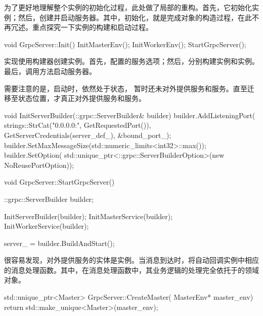 \begin{content}
为了更好地理解整个实例的初始化过程，此处做了局部的重构。首先，它初始化实例；然后，创建并启动服务器。其中，初始化，就是完成对象的构造过程，在此不再冗述。重点探究一下实例的构建和启动过程。

\begin{leftbar}
\begin{c++}
void GrpcServer::Init() {
  InitMasterEnv();
  InitWorkerEnv();
  StartGrpcServer();
}
\end{c++}
\end{leftbar}

实现使用构建器创建实例。首先，配置的服务选项；然后，分别构建实例和实例。最后，调用方法启动服务器。

需要注意的是，启动时，依然处于状态，
暂时还未对外提供服务和服务。直至迁移至状态位置，才真正对外提供服务和服务。

\begin{leftbar}
\begin{c++}
void InitServerBuilder(::grpc::ServerBuilder& builder) {
  builder.AddListeningPort(
    strings::StrCat("0.0.0.0:", GetRequestedPort()),
    GetServerCredentials(server_def_), &bound_port_);
  builder.SetMaxMessageSize(std::numeric_limits<int32>::max());
  builder.SetOption(
      std::unique_ptr<::grpc::ServerBuilderOption>(new NoReusePortOption));
}

void GrpcServer::StartGrpcServer() {
  ::grpc::ServerBuilder builder;

  InitServerBuilder(builder);
  InitMasterService(builder);
  InitWorkerService(builder);

  server_ = builder.BuildAndStart();  
}
\end{c++}
\end{leftbar}

很容易发现，对外提供服务的实体是实例。当消息到达时，将自动回调实例中相应的消息处理函数。其中，在消息处理函数中，其业务逻辑的处理完全依托于的领域对象。

\begin{leftbar}
\begin{c++}
std::unique_ptr<Master> GrpcServer::CreateMaster(
    MasterEnv* master_env) {
  return std::make_unique<Master>(master_env);
}


\end{c++}
\end{leftbar}
\end{content}
